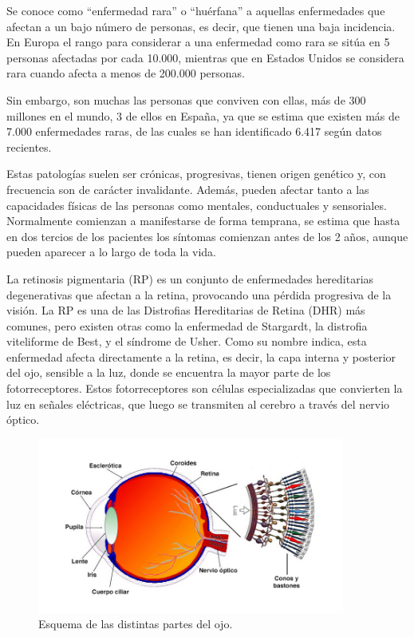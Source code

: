 \documentclass[11pt,spanish,listoffigures,listoftables]{tfgetsinf}
\begin{document}
Se conoce como “enfermedad rara” o “huérfana” a aquellas enfermedades que afectan a un bajo número de personas, es decir, que tienen una baja incidencia. En Europa el rango para considerar a una enfermedad como rara se sitúa en 5 personas afectadas por cada 10.000, mientras que en Estados Unidos se considera rara cuando afecta a menos de 200.000 personas\cite{ENF}.

Sin embargo, son muchas las personas que conviven con ellas, más de 300 millones en el mundo, 3 de ellos en España, ya que se estima que existen más de 7.000 enfermedades raras, de las cuales se han identificado 6.417 según datos recientes\cite{CON}.

Estas patologías suelen ser crónicas, progresivas, tienen origen genético y, con frecuencia son de carácter invalidante. Además, pueden afectar tanto a las capacidades físicas de las personas como mentales, conductuales y sensoriales. Normalmente comienzan a manifestarse de forma temprana, se estima que hasta en dos tercios de los pacientes los síntomas comienzan antes de los 2 años, aunque pueden aparecer a lo largo de toda la vida. 

La retinosis pigmentaria (\acs{RP}) es un conjunto de enfermedades hereditarias degenerativas que afectan a la retina, provocando una pérdida progresiva de la visión. La \acs{RP} es una de las Distrofias Hereditarias de Retina (\acs{DHR}) más comunes, pero existen otras como la enfermedad de Stargardt, la distrofia viteliforme de Best, y el síndrome de Usher. Como su nombre indica, esta enfermedad afecta directamente a la retina, es decir, la capa interna y posterior del ojo, sensible a la luz, donde se encuentra la mayor parte de los fotorreceptores. Estos fotorreceptores son células especializadas que convierten la luz en señales eléctricas, que luego se transmiten al cerebro a través del nervio óptico\cite{GAR}.

\begin{figure}[H]
   \centering
   \includegraphics[width=0.9\textwidth]{retina.jpg}
   \caption{Esquema de las distintas partes del ojo.}
   \label{fig:etiqueta_opcional21}
\end{figure}
\end{document}
